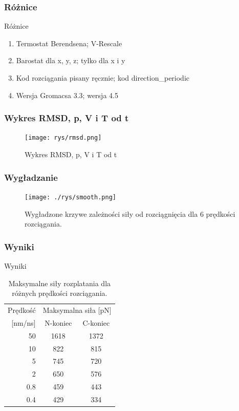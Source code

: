 \documentclass[10pt]{beamer}
\begin{document}
\begin{frame}
\frametitle{Różnice}
\begin{block}{Różnice}
\begin{enumerate}
\item Termostat Berendsena; V-Rescale
\item Barostat dla x, y, z; tylko dla x i y
\item Kod rozciągania pisany ręcznie; kod direction\_periodic
\item Wersja Gromacsa 3.3; wersja 4.5
\end{enumerate}

\end{block}
\end{frame}

\begin{frame}
\frametitle{Wykres RMSD, p, V i T od t}
	\begin{figure}
		\texttt{[image: rys/rmsd.png]} 
		\caption{Wykres RMSD, p, V i T od t}
	\end{figure}
\end{frame}



\begin{frame}
\frametitle{Wygładzanie}
\begin{center}
\begin{figure}[h]
\begin{centering}
\texttt{[image: ./rys/smooth.png]}
\caption{Wygładzone krzywe zależności siły od rozciągnięcia dla 6 prędkości rozciągania.}
\end{centering}
\end{figure}

\end{center}
\end{frame}

\begin{frame}
\frametitle{Wyniki}
\begin{block}{Wyniki}
\begin{center}
\begin{table}[h]
\centering
  \begin{tabular}{| r | c | c |}
  \hline
   Prędkość  & \multicolumn{2}{|c|}{Maksymalna siła [pN]} \\
   \cline{2-3}
    [nm/ns]&  N-koniec  & C-koniec \\
  \hline
  50 & 1618 & 1372 \\
  10 & 822 & 815 \\
  5 & 745 & 720 \\
  2 & 650 & 576 \\
  0.8 & 459 & 443\\
  0.4 & 429 & 334\\
  \hline
  \end{tabular}
  \caption{Maksymalne siły rozplatania dla różnych prędkości rozciągania.}
\end{table}
\end{center}

\end{block}
\end{frame}
\end{document}

